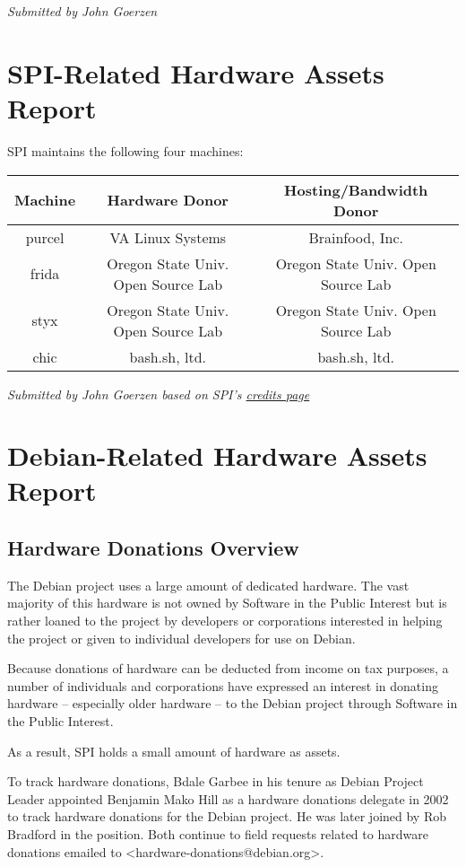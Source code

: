 \documentclass[letterpaper]{report}
\begin{document}
\emph{Submitted by John Goerzen}


\section{SPI-Related Hardware Assets Report}

SPI maintains the following four machines:

\begin{tabular}{|c|c|c|}
\hline
Machine & Hardware Donor & Hosting/Bandwidth Donor\tabularnewline
\hline
\hline
purcel & VA Linux Systems & Brainfood, Inc.\tabularnewline
\hline
frida & Oregon State Univ. Open Source Lab & Oregon State Univ. Open Source Lab\tabularnewline
\hline
styx & Oregon State Univ. Open Source Lab & Oregon State Univ. Open Source Lab\tabularnewline
\hline
chic & bash.sh, ltd. & bash.sh, ltd.\tabularnewline
\hline
\end{tabular}

\emph{Submitted by John Goerzen based on SPI's \href{https://www.spi-inc.org/credits}{credits page}}


\section{Debian-Related Hardware Assets Report}


\subsection{Hardware Donations Overview}

The Debian project uses a large amount of dedicated hardware. The
vast majority of this hardware is not owned by Software in the Public
Interest but is rather loaned to the project by developers or corporations
interested in helping the project or given to individual developers
for use on Debian.

Because donations of hardware can be deducted from income on tax purposes,
a number of individuals and corporations have expressed an interest
in donating hardware -- especially older hardware -- to the Debian
project through Software in the Public Interest.

As a result, SPI holds a small amount of hardware as assets.

To track hardware donations, Bdale Garbee in his tenure as Debian
Project Leader appointed Benjamin Mako Hill as a hardware donations
delegate in 2002 to track hardware donations for the Debian project.
He was later joined by Rob Bradford in the position. Both continue
to field requests related to hardware donations emailed to <hardware-donations@debian.org>.
\end{document}
